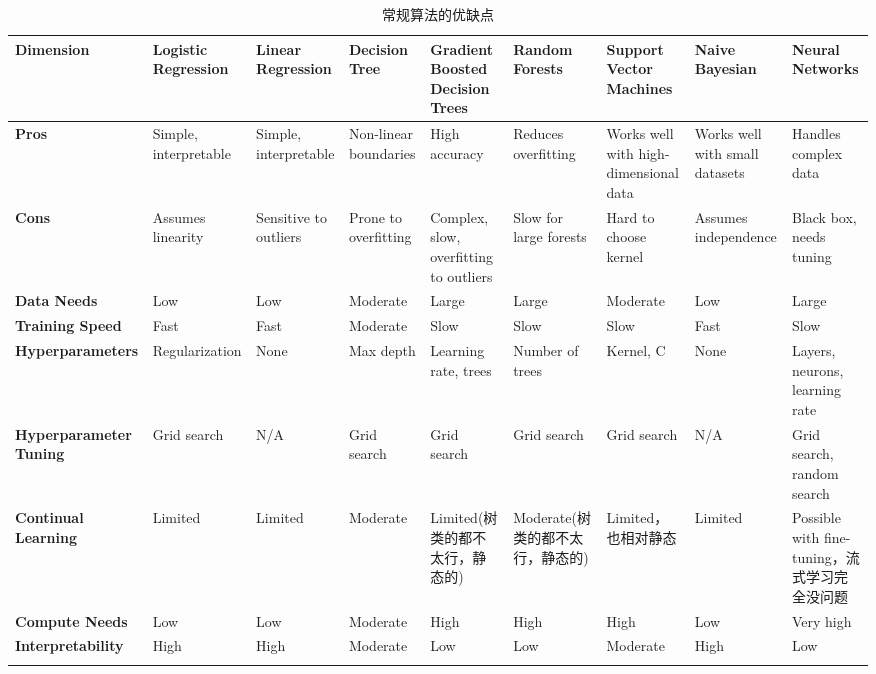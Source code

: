 \documentclass[12pt]{article}
\numberwithin{theorem}{section} %
\numberwithin{definition}{section} %
\numberwithin{assumption}{section} %
\numberwithin{lemma}{section} %
\numberwithin{remark}{section} %
\numberwithin{prop}{section} %
\numberwithin{corollary}{section} %
\numberwithin{example}{section} %
\numberwithin{question}{section} %
\numberwithin{problem}{section} %
\numberwithin{conjecture}{section} %
\numberwithin{append}{section} %
\numberwithin{property}{section} %
\begin{document}
\begin{CJK}{UTF8}{gbsn}
			\scriptsize %
			\begin{longtable}{|p{2cm}|p{1.5cm}|p{1.5cm}|p{1.5cm}|p{1.5cm}|p{1.5cm}|p{1.5cm}|p{1.5cm}|p{1.5cm}|}
				\hline
				\textbf{Dimension} & \textbf{Logistic Regression} & \textbf{Linear Regression} & \textbf{Decision Tree} & \textbf{Gradient Boosted Decision Trees} & \textbf{Random Forests} & \textbf{Support Vector Machines} & \textbf{Naive Bayesian} & \textbf{Neural Networks} \\ \hline
				\textbf{Pros} & Simple, interpretable & Simple, interpretable & Non-linear boundaries & High accuracy & Reduces overfitting & Works well with high-dimensional data & Works well with small datasets & Handles complex data \\ \hline
				\textbf{Cons} & Assumes linearity & Sensitive to outliers & Prone to overfitting & Complex, slow, overfitting to outliers & Slow for large forests & Hard to choose kernel & Assumes independence & Black box, needs tuning \\ \hline
				\textbf{Data Needs} & Low & Low & Moderate & Large & Large & Moderate & Low & Large \\ \hline
				\textbf{Training Speed} & Fast & Fast & Moderate & Slow & Slow & Slow & Fast & Slow \\ \hline
				\textbf{Hyperparameters} & Regularization & None & Max depth & Learning rate, trees & Number of trees & Kernel, C & None & Layers, neurons, learning rate \\ \hline
				\textbf{Hyperparameter Tuning} & Grid search & N/A & Grid search & Grid search & Grid search & Grid search & N/A & Grid search, random search \\ \hline
				\textbf{Continual Learning} & Limited & Limited & Moderate & Limited(树类的都不太行，静态的) & Moderate(树类的都不太行，静态的) & Limited，也相对静态 & Limited & Possible with fine-tuning，流式学习完全没问题 \\ \hline
				\textbf{Compute Needs} & Low & Low & Moderate & High & High & High & Low & Very high \\ \hline
				\textbf{Interpretability} & High & High & Moderate & Low & Low & Moderate & High & Low \\ \hline
				\caption{常规算法的优缺点}
			\end{longtable}
			


\end{CJK}
\end{document}

